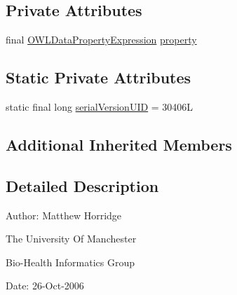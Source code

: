 \subsection*{Private Attributes}
\begin{DoxyCompactItemize}
\item 
final \hyperlink{interfaceorg_1_1semanticweb_1_1owlapi_1_1model_1_1_o_w_l_data_property_expression}{O\-W\-L\-Data\-Property\-Expression} \hyperlink{classuk_1_1ac_1_1manchester_1_1cs_1_1owl_1_1owlapi_1_1_o_w_l_data_property_characteristic_axiom_impl_aef4c9490bb2baa33cc38110d4d03140a}{property}
\end{DoxyCompactItemize}
\subsection*{Static Private Attributes}
\begin{DoxyCompactItemize}
\item 
static final long \hyperlink{classuk_1_1ac_1_1manchester_1_1cs_1_1owl_1_1owlapi_1_1_o_w_l_data_property_characteristic_axiom_impl_aedac673e7dfdd7c081fbb393e28dfbd6}{serial\-Version\-U\-I\-D} = 30406\-L
\end{DoxyCompactItemize}
\subsection*{Additional Inherited Members}


\subsection{Detailed Description}
Author\-: Matthew Horridge\par
 The University Of Manchester\par
 Bio-\/\-Health Informatics Group\par
 Date\-: 26-\/\-Oct-\/2006\par
\par
 

